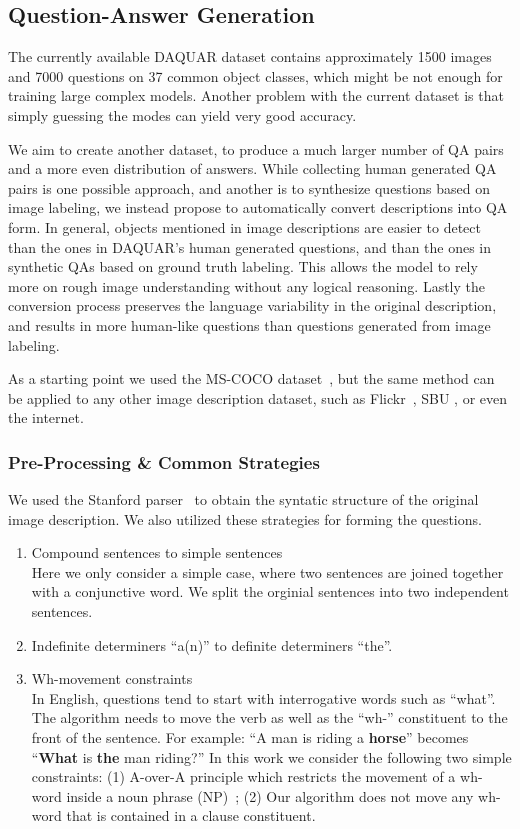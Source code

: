 \documentclass{article} \usepackage{nips15submit_e,times}
\renewcommand{\#}[1]{\textbf{#1}}
\begin{document}
\subsection{Question-Answer Generation}
The currently available DAQUAR dataset contains approximately 1500 images and
7000 questions on 37 common object classes, which might be not enough for
training large complex models. Another problem with the current dataset is that
simply guessing the modes can yield very good accuracy.

We aim to create another dataset, to produce a much larger number of QA pairs
and a more even distribution of answers. While collecting human generated QA
pairs is one possible approach, and another is to synthesize questions based on
image labeling, we instead propose to automatically convert descriptions into
QA form. In general, objects mentioned in image descriptions are easier to
detect than the ones in DAQUAR's human generated questions, and than the ones
in synthetic QAs based on ground truth labeling. This allows the model to
rely more on rough image understanding without any logical reasoning. Lastly
the conversion process preserves the language variability in the original
description, and results in more human-like questions than questions generated
from image labeling.

As a starting point we used
the MS-COCO dataset~\cite{mscoco}, but the same method can be applied to any
other image description dataset, such as Flickr~\cite{flickr8k}, SBU
\cite{ordonez11}, or even the internet.

\subsubsection{Pre-Processing \& Common Strategies}
We used the Stanford parser~\cite{klein03} to obtain the syntatic structure of
the original image description. We also utilized these strategies for forming
the questions.

\begin{enumerate}[leftmargin=*]
\item Compound sentences to simple sentences \\ Here we only consider a simple
case, where two sentences are joined together with a conjunctive word. We split
the orginial sentences into two independent sentences.

\item Indefinite determiners ``a(n)'' to definite determiners ``the''.

\item Wh-movement constraints \\ In English, questions tend to start with
interrogative words such as ``what''. The algorithm needs to move the verb as
well as the ``wh-'' constituent to the front of the sentence. For example: ``A
man is riding a \textbf{horse}'' becomes   ``\textbf{What} is \textbf{the} man
riding?'' In this work we consider the following two simple constraints: (1)
A-over-A principle which restricts the movement of a wh-word inside a noun
phrase (NP)~\cite{chomsky73}; (2) Our algorithm does not move any wh-word that
is contained in a clause constituent.
\end{enumerate}
\end{document}

